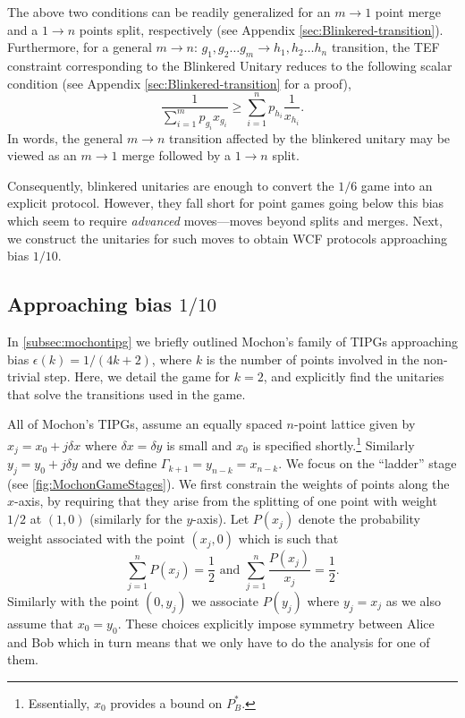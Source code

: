 \documentclass{theoretics}
\newcommand{\atul}[1]{#1} %
\begin{document}
The above two conditions can be readily generalized for an $m\to1$ point merge and a $1\to n$ points split, respectively (see Appendix \cref{sec:Blinkered-transition}). Furthermore, for a general $m\to n$: $g_{1},g_{2}\dots g_{m}\to h_{1},h_{2}\dots h_{n}$ transition, the TEF constraint corresponding to the Blinkered Unitary reduces to the following scalar condition (see Appendix \cref{sec:Blinkered-transition} for a proof),
$$
  \frac{1}{\sum_{i=1}^{m}p_{g_{i}}x_{g_{i}}}\ge\sum_{i=1}^{n}p_{h_{i}}\frac{1}{x_{h_{i}}}.
$$
In words, the general $m\to n$ transition affected by the blinkered unitary may be viewed as an $m\to 1$ merge followed by a $1\to n$ split.

Consequently, blinkered unitaries are enough to convert the
$1/6$ game into an explicit protocol. However, they fall short for point games going below this bias which seem to require \emph{advanced} moves---moves beyond splits and merges. Next, we construct the unitaries for such moves to obtain WCF protocols approaching bias $1/10$.
%
%
%

%
%
\subsection{Approaching bias \texorpdfstring{$1/10$}{1/10}} \label{subsec:Bias1by10gameprotocol}

In \cref{subsec:mochontipg} we briefly outlined
Mochon's family of TIPGs approaching bias $\epsilon(k)=1/(4k+2)$, where $k$ is the number of points involved in the non-trivial step. Here, we detail the game for
$k=2$, and explicitly find the unitaries that solve the transitions used in the game.
%

%
%
%

All of Mochon's TIPGs, assume an equally spaced $n$-point lattice given by $x_{j}=x_{0}+j\delta x$
where $\delta x=\delta y$ is small and $x_{0}$ is specified shortly.\footnote{Essentially, $x_0$ provides a bound on $P^*_B$.} Similarly $y_{j}=y_{0}+j\delta y$ and we define $\Gamma_{k+1}=y_{n-k}=x_{n-k}$. We focus on the ``ladder'' stage \atul{(see  \cref{fig:MochonGameStages})}. We first constrain the weights of points along the $x$-axis, by requiring that they arise from the splitting of one point with weight $1/2$ at $(1,0)$ (similarly for the $y$-axis). Let $P(x_{j})$ denote the probability weight associated with the point $(x_{j},0)$ which is such that \begin{displaymath}
  \sum_{j=1}^{n}P(x_{j})=\frac{1}{2} \text{ and }\sum_{j=1}^{n}\frac{P(x_{j})}{x_{j}}=\frac{1}{2}.
\end{displaymath}
Similarly with the point $(0,y_{j})$ we associate $P(y_{j})$ where
$y_{j}=x_{j}$ as we also assume that $x_{0}=y_{0}$. These choices
explicitly impose symmetry between Alice and Bob which in turn means
that we only have to do the analysis for one of them.
\end{document}
